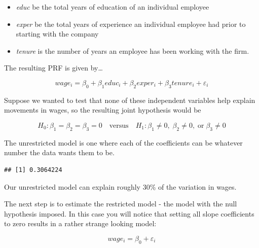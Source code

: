 \documentclass[
]{book}
\newenvironment{Shaded}{\begin{snugshade}}{\end{snugshade}}
\newcommand{\AttributeTok}[1]{\textcolor[rgb]{0.77,0.63,0.00}{#1}}
\newcommand{\FunctionTok}[1]{\textcolor[rgb]{0.00,0.00,0.00}{#1}}
\newcommand{\NormalTok}[1]{#1}
\newcommand{\OtherTok}[1]{\textcolor[rgb]{0.56,0.35,0.01}{#1}}
\newcommand{\SpecialCharTok}[1]{\textcolor[rgb]{0.00,0.00,0.00}{#1}}
\newcommand{\StringTok}[1]{\textcolor[rgb]{0.31,0.60,0.02}{#1}}
\begin{document}
\begin{itemize}
\item
  \emph{educ} be the total years of education of an individual employee
\item
  \emph{exper} be the total years of experience an individual employee had prior to starting with the company
\item
  \emph{tenure} is the number of years an employee has been working with the firm.
\end{itemize}

The resulting PRF is given by\ldots{}

\[wage_i=\beta_0+\beta_1educ_i+\beta_2exper_i+\beta_3tenure_i+\varepsilon_i\]

Suppose we wanted to test that none of these independent variables help explain movements in wages, so the resulting joint hypothesis would be

\[H_0: \beta_1 = \beta_2 = \beta_3 = 0 \quad \text{versus} \quad H_1: \beta_1 \neq 0, \; \beta_2 \neq 0, \; \text{or} \; \beta_3 \neq 0\]

The unrestricted model is one where each of the coefficients can be whatever number the data wants them to be.

\begin{Shaded}
\end{Shaded}

\begin{verbatim}
## [1] 0.3064224
\end{verbatim}

Our unrestricted model can explain roughly 30\% of the variation in wages.

The next step is to estimate the restricted model - the model with the null hypothesis imposed. In this case you will notice that setting all slope coefficients to zero results in a rather strange looking model:

\[wage_i=\beta_0+\varepsilon_i\]
\end{document}
